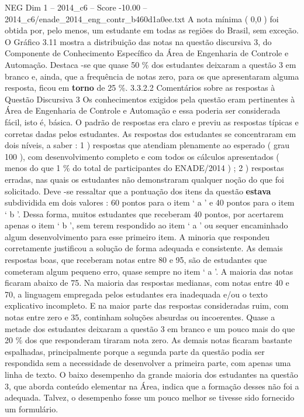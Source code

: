 \begin{textsample}{NEG Dim 1 – 2014\_c6 – Score -10.00 – 2014\_c6/enade\_2014\_eng\_contr\_b460d1a0ee.txt}
A nota mínima ( 0,0 ) foi obtida por, pelo menos, um estudante em todas as regiões do Brasil, sem exceção.
O Gráfico 3.11 mostra a distribuição das notas na questão discursiva 3, do Componente de Conhecimento Específico da Área de Engenharia de Controle e Automação.
Destaca -se que quase 50 \% dos estudantes deixaram a questão 3 em branco e, ainda, que a frequência de notas zero, para os que apresentaram alguma resposta, ficou em \textbf{torno} de 25 \%. 3.3.2.2 Comentários sobre as respostas à Questão Discursiva 3 Os conhecimentos exigidos pela questão eram pertinentes à Área de Engenharia de Controle e Automação e essa poderia ser considerada fácil, isto é, básica.
O padrão de respostas era claro e previu as respostas típicas e corretas dadas pelos estudantes.
As respostas dos estudantes se concentraram em dois níveis, a saber : 1 ) respostas que atendiam plenamente ao esperado ( grau 100 ), com desenvolvimento completo e com todos os cálculos apresentados ( menos do que 1 \% do total de participantes do ENADE/2014 ) ; 2 ) respostas erradas, nas quais os estudantes não demonstraram qualquer noção do que foi solicitado.
Deve -se ressaltar que a pontuação dos itens da questão \textbf{estava} subdividida em dois valores : 60 pontos para o item ‘ a ’ e 40 pontos para o item ‘ b ’.
Dessa forma, muitos estudantes que receberam 40 pontos, por acertarem apenas o item ‘ b ’, sem terem respondido ao item ‘ a ’ ou sequer encaminhado algum desenvolvimento para esse primeiro item.
A minoria que respondeu corretamente justificou a solução de forma adequada e consistente.
As demais respostas boas, que receberam notas entre 80 e 95, são de estudantes que cometeram algum pequeno erro, quase sempre no item ‘ a ’.
A maioria das notas ficaram abaixo de 75.
Na maioria das respostas medianas, com notas entre 40 e 70, a linguagem empregada pelos estudantes era inadequada e/ou o texto explicativo incompleto.
E na maior parte das respostas consideradas ruim, com notas entre zero e 35, continham soluções absurdas ou incoerentes.
Quase a metade dos estudantes deixaram a questão 3 em branco e um pouco mais do que 20 \% dos que responderam tiraram nota zero.
As demais notas ficaram bastante espalhadas, principalmente porque a segunda parte da questão podia ser respondida sem a necessidade de desenvolver a primeira parte, com apenas uma linha de texto.
O baixo desempenho da grande maioria dos estudantes na questão 3, que aborda conteúdo elementar na Área, indica que a formação desses não foi a adequada.
Talvez, o desempenho fosse um pouco melhor se tivesse sido fornecido um formulário.

\end{textsample}

